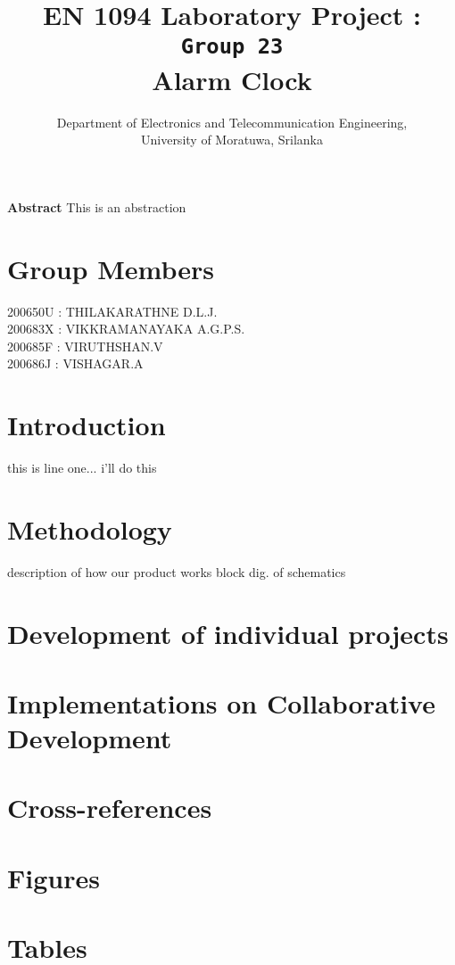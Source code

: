 \documentclass{article}
\begin{document}
\title{ EN 1094 Laboratory Project :                   \texttt{Group 23\\ }
\sffamily
Alarm Clock}

\author{Department of Electronics and Telecommunication Engineering,\\ University of Moratuwa, Srilanka}

\maketitle

{\Large{\textbf{Abstract}}}
\newline
    {\large This is an abstraction }
    
\section{Group Members}
{200650U : THILAKARATHNE D.L.J.\\
200683X : VIKKRAMANAYAKA A.G.P.S.\\
200685F : VIRUTHSHAN.V\\
200686J : VISHAGAR.A}

\section{Introduction}
{\large this is line one... i'll do this}
\section{Methodology}
description of how our product works block dig. of schematics

\section{Development of individual projects }

\section{Implementations on Collaborative Development}

\section{Cross-references}

\section{Figures}

\section{Tables}
\end{document}
